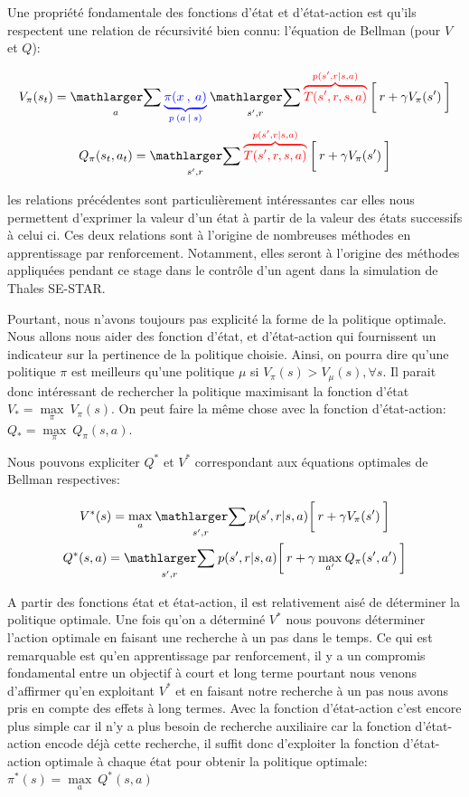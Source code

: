 Une propriété fondamentale des fonctions d'état et d'état-action est qu'ils respectent une relation de récursivité bien connu: l'équation de Bellman (pour $V$ et $Q$):

\begin{gather}
V_\pi(s_t) = \underset{a}{\bsum}\: \policyc{blue} \:\underset{s', r}{\bsum}\:\dynamicsc{red}\: \bigg[\: r + \gamma V_\pi(s') \:\bigg] \\
Q_\pi(s_t, a_t) = \underset{s', r}{\bsum}\:\dynamicsc{red}\: \bigg[\: r + \gamma V_\pi(s') \:\bigg] 
\end{gather}

\bigskip

les relations précédentes sont particulièrement intéressantes car elles nous permettent d'exprimer la valeur d'un état à partir de la valeur des états successifs à celui ci. Ces deux relations sont à l'origine de nombreuses méthodes en apprentissage par renforcement. Notamment, elles seront à l'origine des méthodes appliquées pendant ce stage dans le contrôle d'un agent dans la simulation de Thales SE-STAR.

Pourtant, nous n'avons toujours pas explicité la forme de la politique optimale. Nous allons nous aider des fonction d'état, et d'état-action qui fournissent un indicateur sur la pertinence de la politique choisie. Ainsi, on pourra dire qu'une politique $\pi$ est meilleurs qu'une politique $\mu$ si $V_\pi(s) > V_\mu(s), \forall s $. Il parait donc intéressant de rechercher la politique maximisant la fonction d'état $ V_* = \underset{\pi}{\max} \:V_\pi(s) $. On peut faire la même chose avec la fonction d'état-action: $ Q_* = \underset{\pi}{\max} \:Q_\pi(s, a) $.

Nous pouvons expliciter $Q^*$ et $V^*$ correspondant aux équations optimales de Bellman respectives:

\begin{gather}
V^*(s) = \underset{a}{\max} \: \underset{s', r}{\bsum} \: p(s',r \vert s, a) \bigg[\: r + \gamma V_\pi(s') \:\bigg]
\\
Q^*(s, a) = \underset{s', r}{\bsum} \: p(s',r \vert s, a) \bigg[\: r + \gamma \: \underset{a'}{\max} \: Q_\pi(s', a') \:\bigg]
\end{gather}
\bigskip


A partir des fonctions état et état-action, il est relativement aisé de déterminer la politique optimale. Une fois qu'on a déterminé $V^*$ nous pouvons déterminer l'action optimale en faisant une recherche à un pas dans le temps. Ce qui est remarquable est qu'en apprentissage par renforcement, il y a un compromis fondamental entre un objectif à court et long terme pourtant nous venons d'affirmer qu'en exploitant $V^*$ et en faisant notre recherche à un pas nous avons pris en compte des effets à long termes. Avec la fonction d'état-action c'est encore plus simple car il n'y a plus besoin de recherche auxiliaire car la fonction d'état-action encode déjà cette recherche, il suffit donc d'exploiter la fonction d'état-action optimale à chaque état pour obtenir la politique optimale: $\pi^*(s) = \underset{a}{\max}\:Q^*(s,a)$ 

